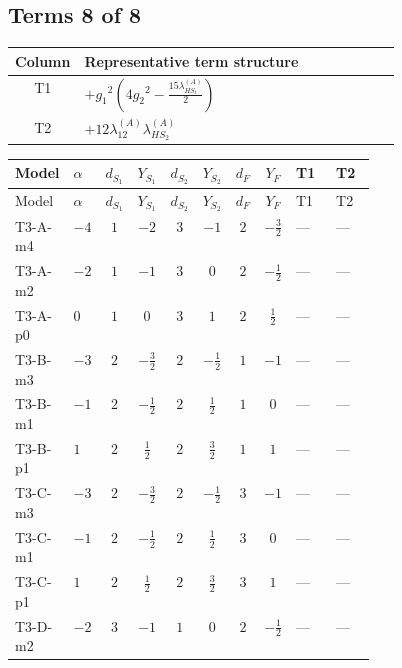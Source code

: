 \documentclass[8pt]{article}
\begin{document}
\begin{landscape}
\subsection*{Terms 8 of 8}
\begin{center}
\begin{tabular}{@{}c >{\raggedright\arraybackslash}p{0.82\linewidth}@{}}
\toprule
Column & Representative term structure \\
\midrule
T1 & \(\displaystyle +{g_1}^2 \left(4 {g_2}^2-\frac{15 {\lambda_{HS_1}^{(A)}}}{2}\right)\) \\
\midrule
T2 & \(\displaystyle +12 {\lambda_{12}^{(A)}} {\lambda_{HS_2}^{(A)}}\) \\
\midrule
\bottomrule
\end{tabular}
\end{center}
\smallskip
\tiny
\begin{longtable}{@{}llcccccc >{\raggedright\arraybackslash}p{0.21\linewidth} >{\raggedright\arraybackslash}p{0.21\linewidth}@{}}
\toprule
Model & $\alpha$ & $d_{S_1}$ & $Y_{S_1}$ & $d_{S_2}$ & $Y_{S_2}$ & $d_F$ & $Y_F$ & T1 & T2 \\
\midrule
\endfirsthead
\toprule
Model & $\alpha$ & $d_{S_1}$ & $Y_{S_1}$ & $d_{S_2}$ & $Y_{S_2}$ & $d_F$ & $Y_F$ & T1 & T2 \\
\midrule
\endhead
T3-A-m4 & $-4$ & $1$ & $-2$ & $3$ & $-1$ & $2$ & $-\frac{3}{2}$ & --- & --- \\
\midrule
T3-A-m2 & $-2$ & $1$ & $-1$ & $3$ & $0$ & $2$ & $-\frac{1}{2}$ & --- & --- \\
\midrule
T3-A-p0 & $0$ & $1$ & $0$ & $3$ & $1$ & $2$ & $\frac{1}{2}$ & --- & --- \\
\midrule
T3-B-m3 & $-3$ & $2$ & $-\frac{3}{2}$ & $2$ & $-\frac{1}{2}$ & $1$ & $-1$ & --- & --- \\
\midrule
T3-B-m1 & $-1$ & $2$ & $-\frac{1}{2}$ & $2$ & $\frac{1}{2}$ & $1$ & $0$ & --- & --- \\
\midrule
T3-B-p1 & $1$ & $2$ & $\frac{1}{2}$ & $2$ & $\frac{3}{2}$ & $1$ & $1$ & --- & --- \\
\midrule
T3-C-m3 & $-3$ & $2$ & $-\frac{3}{2}$ & $2$ & $-\frac{1}{2}$ & $3$ & $-1$ & --- & --- \\
\midrule
T3-C-m1 & $-1$ & $2$ & $-\frac{1}{2}$ & $2$ & $\frac{1}{2}$ & $3$ & $0$ & --- & --- \\
\midrule
T3-C-p1 & $1$ & $2$ & $\frac{1}{2}$ & $2$ & $\frac{3}{2}$ & $3$ & $1$ & --- & --- \\
\midrule
T3-D-m2 & $-2$ & $3$ & $-1$ & $1$ & $0$ & $2$ & $-\frac{1}{2}$ & --- & --- \\

\end{longtable}
\end{landscape}
\end{document}
